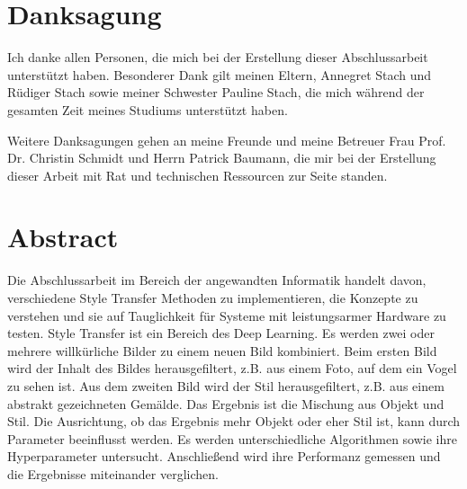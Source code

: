 \chapter*{Danksagung}

Ich danke allen Personen, die mich bei der Erstellung dieser Abschlussarbeit unterstützt haben. Besonderer Dank gilt meinen Eltern, Annegret Stach und Rüdiger Stach sowie meiner Schwester Pauline Stach, die mich während der gesamten Zeit meines Studiums unterstützt haben.

Weitere Danksagungen gehen an meine Freunde und meine Betreuer Frau Prof. Dr. Christin Schmidt und Herrn Patrick Baumann, die mir bei der Erstellung dieser Arbeit mit Rat und technischen Ressourcen zur Seite standen.

\pagebreak

\chapter*{Abstract}

Die Abschlussarbeit im Bereich der angewandten Informatik handelt davon, verschiedene Style Transfer Methoden zu implementieren, die Konzepte zu verstehen und sie auf Tauglichkeit für Systeme mit leistungsarmer Hardware zu testen. Style Transfer ist ein Bereich des Deep Learning. Es werden zwei oder mehrere willkürliche Bilder zu einem neuen Bild kombiniert. Beim ersten Bild wird der Inhalt des Bildes herausgefiltert, z.B. aus einem Foto, auf dem ein Vogel zu sehen ist. Aus dem zweiten Bild wird der Stil herausgefiltert, z.B. aus einem abstrakt gezeichneten Gemälde. Das Ergebnis ist die Mischung aus Objekt und Stil. Die Ausrichtung, ob das Ergebnis mehr Objekt oder eher Stil ist, kann durch Parameter beeinflusst werden. Es werden unterschiedliche Algorithmen sowie ihre Hyperparameter untersucht. Anschließend wird ihre Performanz gemessen und die Ergebnisse miteinander verglichen.